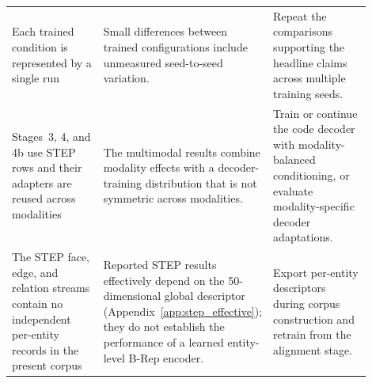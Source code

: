 \documentclass[preprint,12pt]{elsarticle}
\begin{document}
\begin{table}[htbp]
\begin{tabular}{
      >{\raggedright\arraybackslash}p{0.28\linewidth}
      >{\raggedright\arraybackslash}p{0.32\linewidth}
      >{\raggedright\arraybackslash}p{0.30\linewidth}
    }
    Each trained condition is represented by a single run
     & Small differences between trained configurations include unmeasured
    seed-to-seed variation.
     & Repeat the comparisons supporting the headline claims across multiple
    training seeds.                                                            \\

    Stages~3, 4, and 4b use STEP rows and their adapters are reused across
    modalities
     & The multimodal results combine modality effects with a decoder-training
    distribution that is not symmetric across modalities.
     & Train or continue the code decoder with modality-balanced conditioning,
    or evaluate modality-specific decoder adaptations.                         \\

    The STEP face, edge, and relation streams contain no independent per-entity
    records in the present corpus
     & Reported STEP results effectively depend on the 50-dimensional global
    descriptor (Appendix~\ref{app:step_effective}); they do not establish
    the performance of a learned entity-level B-Rep encoder.
     & Export per-entity descriptors during corpus construction and retrain
    from the alignment stage.                                                  \\

    \bottomrule
  \end{tabular}
\end{table}

\clearpage



\end{document}
